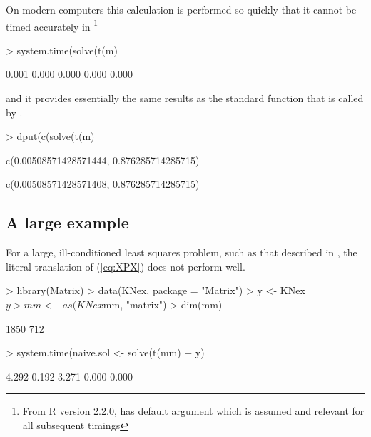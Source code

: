 \documentclass{article}
\begin{document}
On modern computers this calculation is performed so quickly that it cannot
be timed accurately in \RR{}
\footnote{From R version 2.2.0,  has default argument
   which is assumed and relevant for all subsequent timings}
\begin{Schunk}
\begin{Sinput}
> system.time(solve(t(m) %*% m) %*% t(m) %*% yo)
\end{Sinput}
\begin{Soutput}
[1] 0.001 0.000 0.000 0.000 0.000
\end{Soutput}
\end{Schunk}
and it provides essentially the same results as the standard
 function that is called by .
\begin{Schunk}
\begin{Sinput}
> dput(c(solve(t(m) %*% m) %*% t(m) %*% yo))
\end{Sinput}
\begin{Soutput}
c(0.00508571428571444, 0.876285714285715)
\end{Soutput}
\begin{Soutput}
c(0.00508571428571408, 0.876285714285715)
\end{Soutput}
\end{Schunk}

\subsection{A large example}
\label{sec:largeLSQ}

For a large, ill-conditioned least squares problem, such as that
described in \citet{koen:ng:2003}, the literal translation of
(\ref{eq:XPX}) does not perform well.
\begin{Schunk}
\begin{Sinput}
> library(Matrix)
> data(KNex, package = "Matrix")
> y <- KNex$y
> mm <- as(KNex$mm, "matrix")
> dim(mm)
\end{Sinput}
\begin{Soutput}
[1] 1850  712
\end{Soutput}
\begin{Sinput}
> system.time(naive.sol <- solve(t(mm) %*% mm) %*% t(mm) %*% 
+     y)
\end{Sinput}
\begin{Soutput}
[1] 4.292 0.192 3.271 0.000 0.000
\end{Soutput}
\end{Schunk}
\end{document}
